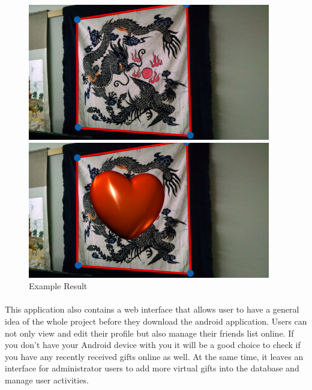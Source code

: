 \begin{figure}[H]
\centering
\begin{minipage}[t]{0.5\textwidth}
\includegraphics[width=.95\textwidth]{section01/assets/giftbox_1.png}
\subcaption{}
\end{minipage}%
\begin{minipage}[t]{0.5\textwidth}
\includegraphics[width=.95\textwidth]{section01/assets/giftbox_2.png}
\subcaption{}
\end{minipage}%
\caption[Short Caption]{Example Result}
\end{figure}

\paragraph{} This application also contains a web interface that allows user to have a general idea of the whole project before they download the android application. Users can not only view and edit their profile but also manage their friends list online. If you don't have your Android device with you it will be a good choice to check if you have any recently received gifts online as well. At the same time, it leaves an interface for administrator users to add more virtual gifts into the database and manage user activities.



